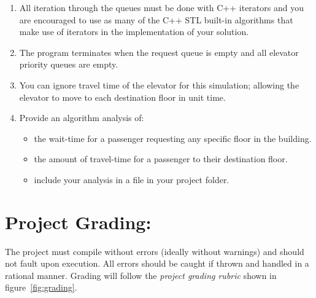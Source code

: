\documentclass[10pt]{article}
\begin{document}
\begin{enumerate}
	\item All iteration through the queues must be done with C++ iterators and you are encouraged to use as many of the C++ STL built-in algorithms that make use of iterators in the implementation of your solution.

	\item The program terminates when the request queue is empty and all elevator priority queues are empty.

	\item You can ignore travel time of the elevator for this simulation; allowing the elevator to move to each destination floor in unit time.
   
   \item Provide an algorithm analysis of:
   \begin{itemize}
      \item the wait-time for a passenger requesting any specific floor in the building.
   
      \item the amount of travel-time for a passenger to their destination floor.
      
      \item include your analysis in a file in your project folder.
   \end{itemize}
\end{enumerate}

\newpage
\section*{Project Grading:}

The project must compile without errors (ideally without warnings) and should not fault upon execution. All errors should be caught if thrown and handled in a rational manner. Grading will follow the \emph{project grading rubric} shown in figure~\ref{fig:grading}.
\end{document}
